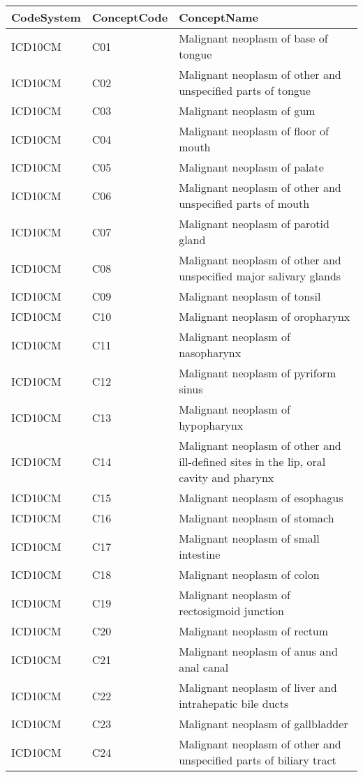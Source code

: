 \begin{table}[ht]
\centering
\begin{tabular}{lll}
  \hline
CodeSystem & ConceptCode & ConceptName \\ 
  \hline
ICD10CM & C01 & Malignant neoplasm of base of tongue \\ 
  ICD10CM & C02 & Malignant neoplasm of other and unspecified parts of tongue \\ 
  ICD10CM & C03 & Malignant neoplasm of gum \\ 
  ICD10CM & C04 & Malignant neoplasm of floor of mouth \\ 
  ICD10CM & C05 & Malignant neoplasm of palate \\ 
  ICD10CM & C06 & Malignant neoplasm of other and unspecified parts of mouth \\ 
  ICD10CM & C07 & Malignant neoplasm of parotid gland \\ 
  ICD10CM & C08 & Malignant neoplasm of other and unspecified major salivary glands \\ 
  ICD10CM & C09 & Malignant neoplasm of tonsil \\ 
  ICD10CM & C10 & Malignant neoplasm of oropharynx \\ 
  ICD10CM & C11 & Malignant neoplasm of nasopharynx \\ 
  ICD10CM & C12 & Malignant neoplasm of pyriform sinus \\ 
  ICD10CM & C13 & Malignant neoplasm of hypopharynx \\ 
  ICD10CM & C14 & Malignant neoplasm of other and ill-defined sites in the lip, oral cavity and pharynx \\ 
  ICD10CM & C15 & Malignant neoplasm of esophagus \\ 
  ICD10CM & C16 & Malignant neoplasm of stomach \\ 
  ICD10CM & C17 & Malignant neoplasm of small intestine \\ 
  ICD10CM & C18 & Malignant neoplasm of colon \\ 
  ICD10CM & C19 & Malignant neoplasm of rectosigmoid junction \\ 
  ICD10CM & C20 & Malignant neoplasm of rectum \\ 
  ICD10CM & C21 & Malignant neoplasm of anus and anal canal \\ 
  ICD10CM & C22 & Malignant neoplasm of liver and intrahepatic bile ducts \\ 
  ICD10CM & C23 & Malignant neoplasm of gallbladder \\ 
  ICD10CM & C24 & Malignant neoplasm of other and unspecified parts of biliary tract \\ 

\end{tabular}
\end{table}
